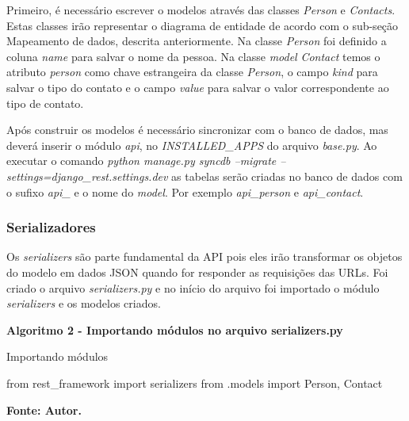  Primeiro, é necessário escrever o modelos através das classes \textit{Person} e \textit{Contacts}. Estas classes irão representar o diagrama
  de entidade de acordo com o sub-seção Mapeamento de dados, descrita anteriormente.
  Na classe \textit{Person} foi definido a coluna \textit{name} para salvar o nome da pessoa.  
  Na classe \textit{model} \textit{Contact} temos o atributo \textit{person} como chave estrangeira da classe \textit{Person}, 
  o campo \textit{kind} para salvar o tipo do contato e o campo \textit{value} para salvar o valor correspondente ao tipo de contato.
  
  Após construir os modelos é necessário sincronizar com o banco de dados, mas deverá inserir o módulo \textit{api}, no 
  \textit{INSTALLED\_APPS} do arquivo \textit{base.py}. Ao executar o comando \textit{python manage.py syncdb --migrate --settings=django\_rest.settings.dev}
  as tabelas serão criadas no banco de dados com o sufixo \textit{api\_} e o nome do \textit{model}. Por exemplo \textit{api\_person} e \textit{api\_contact}.
  
\subsubsection{Serializadores}

  Os \textit{serializers} são parte fundamental da API pois eles irão transformar os objetos do modelo em dados \ac{JSON} quando for 
  responder as requisições das URLs.
  Foi criado o arquivo \textit{serializers.py} e no início do arquivo foi importado o módulo \textit{serializers} e os modelos
  criados.
  
  \begin{center}	
    \textbf{Algoritmo 2 -  Importando módulos no arquivo serializers.py}
    \vspace{-0.3cm}
    \begin{minipage}[ht]{13cm}
      \begin{algorithm}[H]
      \footnotesize
      \caption{Importando módulos}
      \label{alg:imports_serializers}
	\begin{algorithmic}[1]
	  \STATE from rest\_framework import serializers 
	  \STATE from .models import Person, Contact
	\end{algorithmic}
      \end{algorithm}

      \small \centering \textbf{\footnotesize Fonte: Autor.}
    \end{minipage}
  \end{center}
  
